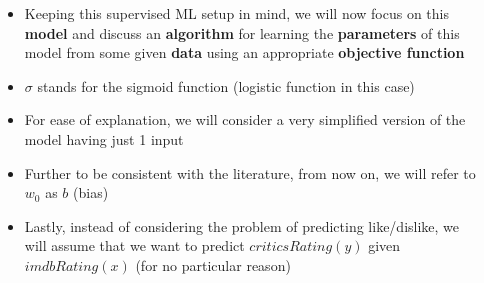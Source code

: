 \begin{frame}
\end{frame}

\begin{frame}
	\begin{columns}
		\begin{overlayarea}{\textwidth}{\textheight}
			\only<1-2>{
				\begin{center}
					
				\end{center}
			}
			\only<3->{
				\begin{center}
					
				\end{center}
			}
		\end{overlayarea}
		\begin{overlayarea}{\textwidth}{\textheight}
			\begin{itemize}\justifying
				\item<1-> Keeping this supervised ML setup in mind, we will now focus on this \textbf{model} and discuss an \textbf{algorithm} for learning the \textbf{parameters} of this model from some given \textbf{data} using an appropriate \textbf{objective function}
				\item<2-> $\sigma$ stands for the sigmoid function (logistic function in this case)
				\item<3-> For ease of explanation, we will consider a very simplified version of the model having just 1 input
				\item<4-> Further to be consistent with the literature, from now on, we will refer to $w_0$ as $b$ (bias)
				\item<5-> Lastly, instead of considering the problem of predicting like/dislike, we will assume that we want to predict $criticsRating (y)$ given  $imdbRating (x)$ (for no particular reason)
			\end{itemize}
		\end{overlayarea}
	\end{columns}
\end{frame}


